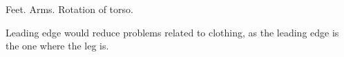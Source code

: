 Feet.
Arms.
Rotation of torso.

\label{FutureWork:BaggyTrousers}
Leading edge would reduce problems related to clothing, as the leading edge is the one where the leg is.

